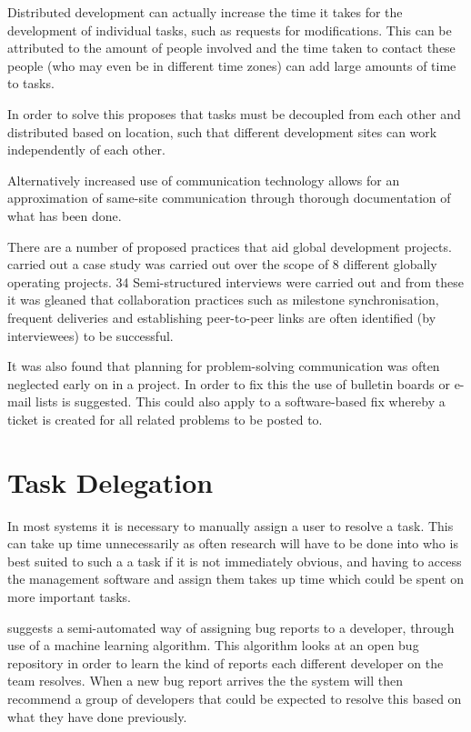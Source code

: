 \documentclass{l4proj}
\begin{document}
Distributed development can actually increase the time it takes for the development of individual tasks, such as requests for modifications.  This can be attributed to the amount of people involved and the time taken to contact these people (who may even be in different time zones) can add large amounts of time to tasks.  

In order to solve this \citet{herbsleb03empirical} proposes that tasks must be decoupled from each other and distributed based on location, such that different development sites can work independently of each other.

Alternatively increased use of communication technology allows for an approximation of same-site communication through thorough documentation of what has been done.

There are a number of proposed practices that aid global development projects.  \citet{paasivaara03collaboration} carried out a case study was carried out over the scope of 8 different globally operating projects.  34 Semi-structured interviews were carried out and from these it was gleaned that collaboration practices such as milestone synchronisation, frequent deliveries and establishing peer-to-peer links are often identified (by interviewees) to be successful. 

It was also found that planning for problem-solving communication was often neglected early on in a project.  In order to fix this the use of bulletin boards or e-mail lists is suggested.  This could also apply to a software-based fix whereby a ticket is created for all related problems to be posted to.

\section {Task Delegation}

In most systems it is necessary to manually assign a user to resolve a task.  This can take up time unnecessarily as often research will have to be done into who is best suited to such a a task if it is not immediately obvious, and having to access the management software and assign them takes up time which could be spent on more important tasks.

 
\citet{anvik06who} suggests a semi-automated way of assigning bug reports to a developer, through use of a machine learning algorithm.  This algorithm looks at an open bug repository in order to learn the kind of reports each different developer on the team resolves.  When a new bug report arrives the the system will then recommend a group of developers that could be expected to resolve this based on what they have done previously.
\end{document}

